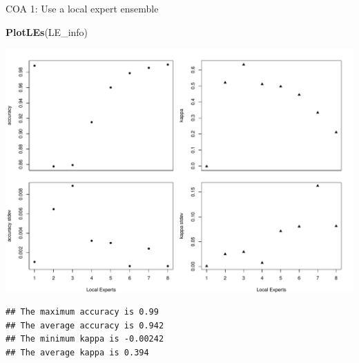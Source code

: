 \documentclass[ignorenonframetext,]{beamer}
\newenvironment{Shaded}{\begin{snugshade}}{\end{snugshade}}
\newcommand{\KeywordTok}[1]{\textcolor[rgb]{0.13,0.29,0.53}{\textbf{{#1}}}}
\newcommand{\NormalTok}[1]{{#1}}
\begin{document}
\begin{frame}[fragile]{COA 1: Use a local expert ensemble}

\footnotesize

\begin{Shaded}
\begin{Highlighting}[]
\KeywordTok{PlotLEs}\NormalTok{(LE_info)}
\end{Highlighting}
\end{Shaded}

\includegraphics{presentation_files/figure-beamer/unnamed-chunk-13-1.pdf}

\begin{verbatim}
## The maximum accuracy is 0.99 
## The average accuracy is 0.942 
## The minimum kappa is -0.00242 
## The average kappa is 0.394
\end{verbatim}

\end{frame}
\end{document}
